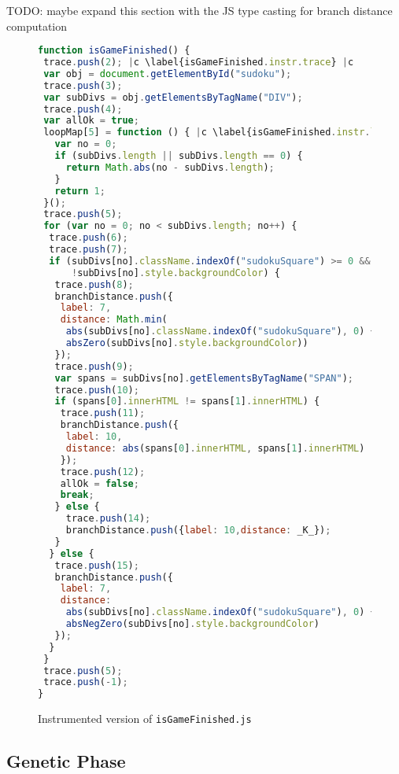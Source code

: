 \documentclass[sigconf]{acmart}
\begin{document}
TODO: maybe expand this section with the JS type casting for branch distance computation 

\begin{figure}[t]
  \begin{lstlisting}[style=htmlcssjs,language=JavaScript]
function isGameFinished() {
 trace.push(2); |c \label{isGameFinished.instr.trace} |c
 var obj = document.getElementById("sudoku");
 trace.push(3);
 var subDivs = obj.getElementsByTagName("DIV");
 trace.push(4);
 var allOk = true;
 loopMap[5] = function () { |c \label{isGameFinished.instr.loopMap} |c
   var no = 0;
   if (subDivs.length || subDivs.length == 0) {
     return Math.abs(no - subDivs.length);
   }
   return 1;
 }();
 trace.push(5);
 for (var no = 0; no < subDivs.length; no++) {
  trace.push(6);
  trace.push(7);
  if (subDivs[no].className.indexOf("sudokuSquare") >= 0 &&
      !subDivs[no].style.backgroundColor) {
   trace.push(8);
   branchDistance.push({ 
    label: 7, 
    distance: Math.min(
     abs(subDivs[no].className.indexOf("sudokuSquare"), 0) + _K_, 
     absZero(subDivs[no].style.backgroundColor))
   });
   trace.push(9);
   var spans = subDivs[no].getElementsByTagName("SPAN");
   trace.push(10);
   if (spans[0].innerHTML != spans[1].innerHTML) {
    trace.push(11);
    branchDistance.push({
     label: 10,
     distance: abs(spans[0].innerHTML, spans[1].innerHTML)
    });
    trace.push(12);
    allOk = false;
    break;
   } else {
     trace.push(14);
     branchDistance.push({label: 10,distance: _K_});
   }
  } else {
   trace.push(15);
   branchDistance.push({
    label: 7,
    distance: 
     abs(subDivs[no].className.indexOf("sudokuSquare"), 0) + 
     absNegZero(subDivs[no].style.backgroundColor)
   });
  }
 }
 trace.push(5);
 trace.push(-1);
}
\end{lstlisting}
  \caption{Instrumented version of \texttt{isGameFinished.js} }
  \label{code.isGameFinished.instr}
\end{figure}

\subsection{Genetic Phase}
\label{sub.sec.genetic.phase}
\end{document}

